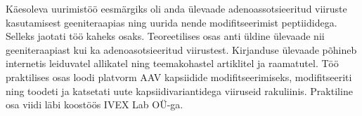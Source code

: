\documentclass{trkut}%
\begin{document}

Käesoleva uurimistöö eesmärgiks oli anda ülevaade adenoassotsieeritud viiruste kasutamisest geeniteraapias ning uurida nende modifitseerimist peptiididega. Selleks jaotati töö kaheks osaks. Teoreetilises osas anti üldine ülevaade nii geeniteraapiast kui ka adenoasotsieeritud viirustest. Kirjanduse ülevaade põhineb internetis leiduvatel allikatel ning teemakohastel artiklitel ja raamatutel. Töö praktilises osas loodi platvorm AAV kapsiidide modifitseerimiseks, modifitseeriti ning toodeti ja katsetati uute kapsiidivariantidega viiruseid rakuliinis. Praktiline osa viidi läbi koostöös IVEX Lab OÜ-ga. 
\end{document}
